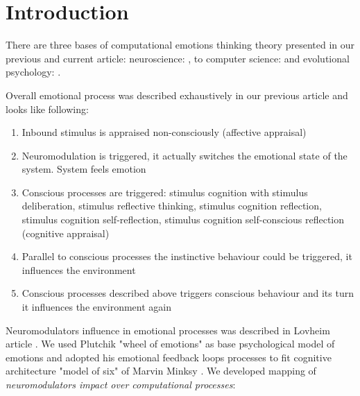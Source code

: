 \section{Introduction}

There are three bases of computational emotions thinking theory presented in our previous\cite{computational_emotional_thinking} and current article: neuroscience: \cite{emotionsbraintorobot, parsingreward, neuromodulatory, cubeofemotions, natureofemotions}, to computer science: \cite{emotionandsociable, senticcomputing, hourglass, affectivemodelofinterplay, affectivecomputing, computationalmodelsemotion, computationalmodelsemotionscognition, evaluatingcomutationalmodel, threelevel} and evolutional psychology: \cite{natureofemotions, primer_affect_psychology, tomkins1, tomkins2, tomkins3, quest}.

Overall emotional process was described exhaustively in our previous article \cite{computational_emotional_thinking} and looks like following:

\begin{enumerate}
	\item  Inbound stimulus is appraised non-consciously (affective appraisal)
	\item  Neuromodulation is triggered, it actually switches the emotional state of the system. System feels emotion
	\item  Conscious processes are triggered: stimulus cognition with stimulus deliberation, stimulus reflective thinking, stimulus cognition reflection, stimulus cognition self-reflection, stimulus cognition self-conscious reflection (cognitive appraisal)
	\item  Parallel to conscious processes the instinctive behaviour could be triggered, it influences the environment
	\item  Conscious processes described above triggers conscious behaviour and its turn it influences the environment again
\end{enumerate}

Neuromodulators influence in emotional processes was described in Lovheim article \cite{cubeofemotions}. We used Plutchik "wheel of emotions" as base psychological model of emotions \cite{natureofemotions} and adopted his emotional feedback loops processes to fit cognitive architecture "model of six" of Marvin Minksy \cite{emotionmachine}. We developed mapping of \emph{neuromodulators impact over computational processes}:

